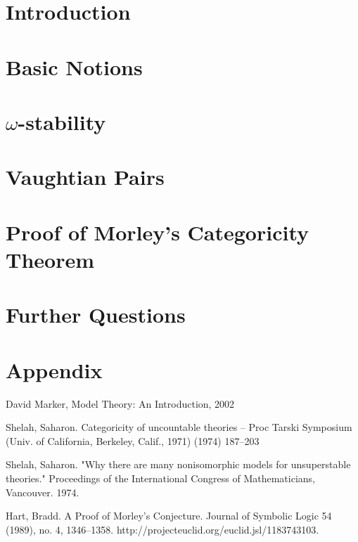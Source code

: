 \documentclass[12pt]{article}
\theoremstyle{definition}
\theoremstyle{definition}
\theoremstyle{plain}
\theoremstyle{remark}
\numberwithin{equation}{section}
\begin{document}

%
%
\tableofcontents
\newpage

\pagestyle{myheadings} \markright{}

%

\section{Introduction}

\newpage

\section{Basic Notions}

\newpage

\section{\(\omega\)-stability}

\newpage

\section{Vaughtian Pairs}

\newpage

\section{Proof of Morley's Categoricity Theorem}

\newpage

\section{Further Questions}

\newpage

\appendix
\section{Appendix}

\newpage

\begin{thebibliography} \small
%
 David Marker, Model Theory: An Introduction, 2002

 Shelah, Saharon. Categoricity of uncountable theories -- Proc Tarski Symposium (Univ. of California, Berkeley, Calif., 1971) (1974) 187--203

 Shelah, Saharon. "Why there are many nonisomorphic models for unsuperstable theories." Proceedings of the International Congress of Mathematicians, Vancouver. 1974.

Hart, Bradd. A Proof of Morley's Conjecture. Journal of Symbolic Logic 54 (1989), no. 4, 1346--1358. http://projecteuclid.org/euclid.jsl/1183743103.
%
\end{thebibliography}
\end{document}

